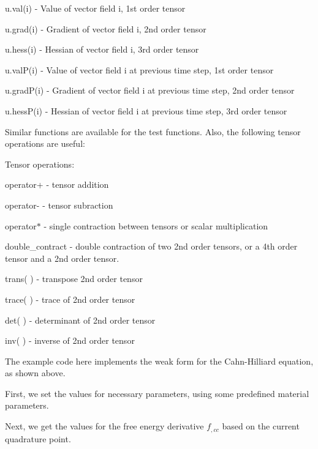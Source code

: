 {\ttfamily u.\-val(i)} -\/ Value of vector field i, 1st order tensor \par
{\ttfamily u.\-grad(i)} -\/ Gradient of vector field i, 2nd order tensor \par
{\ttfamily u.\-hess(i)} -\/ Hessian of vector field i, 3rd order tensor \par
{\ttfamily u.\-val\-P(i)} -\/ Value of vector field i at previous time step, 1st order tensor \par
{\ttfamily u.\-grad\-P(i)} -\/ Gradient of vector field i at previous time step, 2nd order tensor \par
{\ttfamily u.\-hess\-P(i)} -\/ Hessian of vector field i at previous time step, 3rd order tensor

Similar functions are available for the test functions. Also, the following tensor operations are useful\-:

Tensor operations\-: \par
{\ttfamily operator+} -\/ tensor addition \par
{\ttfamily operator-\/} -\/ tensor subraction \par
{\ttfamily operator$\ast$} -\/ single contraction between tensors or scalar multiplication \par
{\ttfamily double\-\_\-contract} -\/ double contraction of two 2nd order tensors, or a 4th order tensor and a 2nd order tensor. \par
{\ttfamily trans( )} -\/ transpose 2nd order tensor \par
{\ttfamily trace( )} -\/ trace of 2nd order tensor \par
{\ttfamily det( )} -\/ determinant of 2nd order tensor \par
{\ttfamily inv( )} -\/ inverse of 2nd order tensor \par


The example code here implements the weak form for the Cahn-\/\-Hilliard equation, as shown above.

First, we set the values for necessary parameters, using some predefined material parameters.


\begin{DoxyCodeInclude}

\end{DoxyCodeInclude}


Next, we get the values for the free energy derivative $f_{,cc}$ based on the current quadrature point.


\begin{DoxyCodeInclude}

\end{DoxyCodeInclude}


